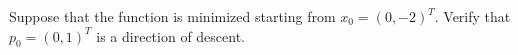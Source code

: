 Suppose that the function is minimized starting from $x_0 = (0, -2)^T$. Verify that $p_0 = (0, 1)^T$ is a direction of 
descent.

\begin{solution}
    \ \\
    \vfill
\end{solution}
